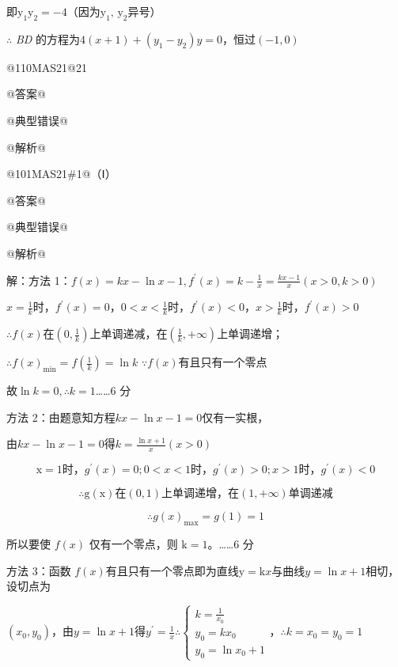 \documentclass{scrbook}
\begin{document}
即$\mathrm{y}_{1}\mathrm{y}_{2}=-4$（因为$\mathrm{y}_{1},\,\mathrm{y}_{2}$异号）

${\therefore}$ \textit{BD} 的方程为$4(x+1)+\left(y_{1}- y_{2}\right)y=0$，恒过$(-1,0)$

@110MA{\textbar}S21@21

@答案@

@典型错误@

@解析@

@101MA{\textbar}S21\#1@（Ⅰ）

@答案@

@典型错误@

@解析@

解：方法 1：$f(x)=kx- \ln x- 1,f^{\prime }(x)=k- \frac{1}{x}=\frac{kx- 1}{x}(x>0,k>0)$

$x=\frac{1}{k}$时，$f^{\prime }(x)=0$，$0<x<\frac{1}{k}$时，$f^{\prime }(x)<0$，$x>\frac{1}{k}\mathrm{时}$，$f^{\prime }(x)>0$

$\therefore f(x)$在$\left(0,\frac{1}{k}\right)$上单调递减，在$\left(\frac{1}{k},+\infty \right)$上单调递增；

$\therefore f(x)_{\min }=f\left(\frac{1}{k}\right)=\ln k$ $\because f(x)\text{有且只有一个零点}$

故$\ln k=0,\therefore k=1${\ldots}{\ldots}6 分

方法 2：由题意知方程$kx- \ln x- 1=0$仅有一实根，

由$kx- \ln x- 1=0$得$k=\frac{\ln x+1}{x}(x>0)$

\begin{equation*}
\mathrm{x}=1\mathrm{时}，g^{\prime }(x)=0;0<x<1\mathrm{时}，g^{\prime }(x)>0;x>1\mathrm{时}，g^{\prime }(x)<0
\end{equation*}

\begin{equation*}
\therefore \mathrm{g}(\mathrm{x})\mathrm{在}(0,1)\text{上单调递增}，\mathrm{在}(1,+\infty )\text{单调递减}
\end{equation*}

\begin{equation*}
\therefore g(x)_{\max }=g(1)=1
\end{equation*}

所以要使 $f(x)$ 仅有一个零点，则 $\mathrm{k}=1$。{\ldots}{\ldots}6 分

方法 3：函数 $f(x)$有且只有一个零点即为直线$\mathrm{y}=\mathrm{k}x$与曲线$y=\ln x+1$相切，设切点为

$\left(x_{0},y_{0}\right)$，由$y=\ln x+1$得$y^{\prime }=\frac{1}{x}$$\therefore \left\{\begin{array}{l}
k=\frac{1}{x_{0}}\\
y_{0}=kx_{0}\\
y_{0}=\ln x_{0}+1
\end{array}\right.，\therefore k=x_{0}=y_{0}=1$
\end{document}
